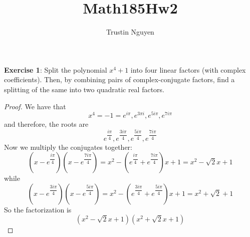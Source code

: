 \documentclass{article}
\title{Math185Hw2}
\author{Trustin Nguyen}
\begin{document}
    \maketitle

\reversemarginpar

\textbf{Exercise 1}: Split the polynomial $x^{4} + 1$ into four linear factors (with complex coefficients). Then, by combining pairs of complex-conjugate factors, find a splitting of the same into two quadratic real factors.
    \begin{proof}
        We have that 
            \begin{equation*}
                x^{4} = -1 = e^{i\pi}, e^{3\pi i}, e^{5i\pi}, e^{7i\pi}
            \end{equation*}
        and therefore, the roots are 
            \begin{equation*}
                e^{\dfrac{i\pi}{4}}, e^{\dfrac{3i\pi}{4}}, e^{\dfrac{5i\pi}{4}}, e^{\dfrac{7i\pi}{4}}
            \end{equation*}
        Now we multiply the conjugates together:
            \begin{equation*}
                (x - e^{\dfrac{i\pi}{4}})(x - e^{\dfrac{7i\pi}{4}}) = x^{2} - (e^{\dfrac{i\pi}{4}} + e^{\dfrac{7i\pi}{4}})x + 1 = x^{2} - \sqrt{2}x + 1
            \end{equation*}
        while
            \begin{equation*}
                (x - e^{\dfrac{3i\pi}{4}})(x - e^{\dfrac{5i\pi}{4}}) = x^{2} - (e^{\dfrac{3i\pi}{4}} + e^{\dfrac{5i\pi}{4}})x + 1 = x^{2} + \sqrt{2} + 1
            \end{equation*}
        So the factorization is 
            \begin{equation*}
                (x^{2} - \sqrt{2}x + 1)(x^{2} + \sqrt{2}x + 1)
            \end{equation*}
    \end{proof}
\end{document}
